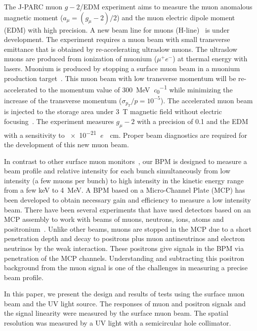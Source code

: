 \documentclass[preprint,3p,twocolumn]{elsarticle}
\begin{document}
The J-PARC muon $g-2$/EDM experiment \cite{E34} aims to measure
the muon anomalous magnetic moment ($a_{\mu} = (g_{\mu}-2)/2$) and the muon electric
dipole moment (EDM) with high precision.  A new beam line for
muons (H-line)~\cite{h-line} is under development.  The
experiment requires a muon beam with small transverse emittance
that is obtained by re-accelerating ultraslow muons.  The
ultraslow muons are produced from ionization of muonium
($\mu^{+}e^{-}$) at thermal
energy with lasers.  Muonium is produced by stopping a surface muon
beam in a muonium production target~\cite{muonium}.  This muon
beam with low transverse momentum will be re-accelerated to the momentum value of
\SI{300}{\MeV\per\clight} \cite{IH} while minimizing the increase
of the transverse momentum ($\sigma_{p_T}/p = 10^{-5}$).
The
accelerated muon beam is injected to the storage area under
\SI{3}{\tesla} magnetic field without electric
focusing~\cite{injection}.
The experiment measures $g_\mu-2$ with a
precision of \SI{0.1}{\ppm} and the EDM with a sensitivity to
\SI{e-21}{\elementarycharge \cdot \cm}.
Proper beam diagnostics
are required for the development of this new muon beam.

In contrast to other surface muon monitors~\cite{muon_bpm1,
muon_bpm3}, our BPM is designed to measure a beam profile and
relative intensity for each bunch simultaneously from low
intensity (a few muons per bunch) to high intensity in the kinetic energy
range from a few \si{keV} to \SI{4}{\MeV}.  A BPM based on
a Micro-Channel Plate (MCP) has been developed to obtain necessary
gain and efficiency to measure a low intensity beam.  There have
been several experiments that have used detectors based on an MCP
assembly to work with beams of muons, neutrons, ions, atoms and
positronium~\cite{muon_bpm2, neutron, Ps}.  Unlike
other beams, muons are stopped in the MCP due to a short penetration depth
and decay to positrons plus muon antineutrinos and electron
neutrinos by the weak interaction. These positrons give signals in
the BPM via penetration of the MCP channels.  Understanding and
subtracting this positron background from the muon signal is one
of the challenges in measuring a precise beam profile.

In this paper, we present the design and results of tests using
the surface muon beam and the UV light source.  The responses of
muon and positron signals and the signal linearity were measured
by the surface
muon beam.  The spatial resolution was measured by a UV light
with a semicircular hole collimator.
\end{document}

